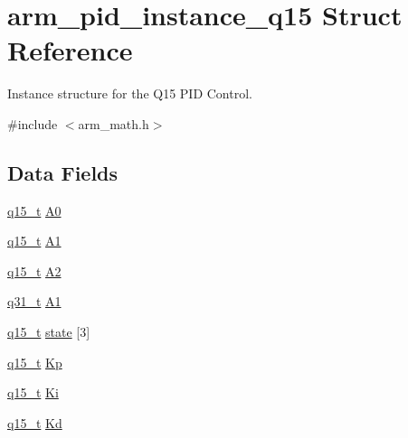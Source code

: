 \hypertarget{structarm__pid__instance__q15}{\section{arm\-\_\-pid\-\_\-instance\-\_\-q15 Struct Reference}
\label{structarm__pid__instance__q15}
}


Instance structure for the Q15 P\-I\-D Control.  




{\ttfamily \#include $<$arm\-\_\-math.\-h$>$}

\subsection*{Data Fields}
\begin{DoxyCompactItemize}
\item 
\hyperlink{arm__math_8h_ab5a8fb21a5b3b983d5f54f31614052ea}{q15\-\_\-t} \hyperlink{structarm__pid__instance__q15_ad77f3a2823c7f96de42c92a3fbf3246b}{A0}
\item 
\hyperlink{arm__math_8h_ab5a8fb21a5b3b983d5f54f31614052ea}{q15\-\_\-t} \hyperlink{structarm__pid__instance__q15_ad8ac5ff736c0e51180398c31f777f18a}{A1}
\item 
\hyperlink{arm__math_8h_ab5a8fb21a5b3b983d5f54f31614052ea}{q15\-\_\-t} \hyperlink{structarm__pid__instance__q15_a33e8b4c2d3e24b8b494f6edca6a89c1b}{A2}
\item 
\hyperlink{arm__math_8h_adc89a3547f5324b7b3b95adec3806bc0}{q31\-\_\-t} \hyperlink{structarm__pid__instance__q15_a1b8412c517071962a9acfdc6778906ec}{A1}
\item 
\hyperlink{arm__math_8h_ab5a8fb21a5b3b983d5f54f31614052ea}{q15\-\_\-t} \hyperlink{structarm__pid__instance__q15_a4a3f0a878b5b6b055e3478a2f244cd30}{state} \mbox{[}3\mbox{]}
\item 
\hyperlink{arm__math_8h_ab5a8fb21a5b3b983d5f54f31614052ea}{q15\-\_\-t} \hyperlink{structarm__pid__instance__q15_ad228aae24a1b6d855c93a8b9bbc1c4f1}{Kp}
\item 
\hyperlink{arm__math_8h_ab5a8fb21a5b3b983d5f54f31614052ea}{q15\-\_\-t} \hyperlink{structarm__pid__instance__q15_a0dcc19d5c8f7bc401acea9e8318cd777}{Ki}
\item 
\hyperlink{arm__math_8h_ab5a8fb21a5b3b983d5f54f31614052ea}{q15\-\_\-t} \hyperlink{structarm__pid__instance__q15_af5d4b53091f19eff7536636b7cc43111}{Kd}
\end{DoxyCompactItemize}


